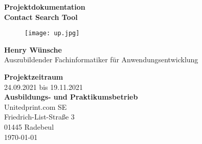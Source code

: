 \begin{titlepage}
    \begin{center}
        {\LARGE\textbf{Projektdokumentation\\}}
        \vspace*{0.5cm}
        {\Huge\textbf{Contact Search Tool}}
        \vspace*{1cm}
        \begin{figure}[hbp]
            \begin{center}
                \texttt{[image: up.jpg]}
            \end{center}
        \end{figure}

        \vfill

        {\textbf{Henry Wünsche}} \\
        Auszubildender Fachinformatiker für Anwendungsentwicklung

        \vspace{0.8cm}
        {\textbf{Projektzeitraum}}\\
        24.09.2021 bis 19.11.2021\\
        \vspace{0.8cm}
        \textbf{Ausbildungs- und Praktikumsbetrieb}\\
        Unitedprint.com SE\\
        Friedrich-List-Straße 3\\
        01445 Radebeul\\
        \vspace*{0.8cm}
        \today
    \end{center}
\end{titlepage}
\pagebreak
